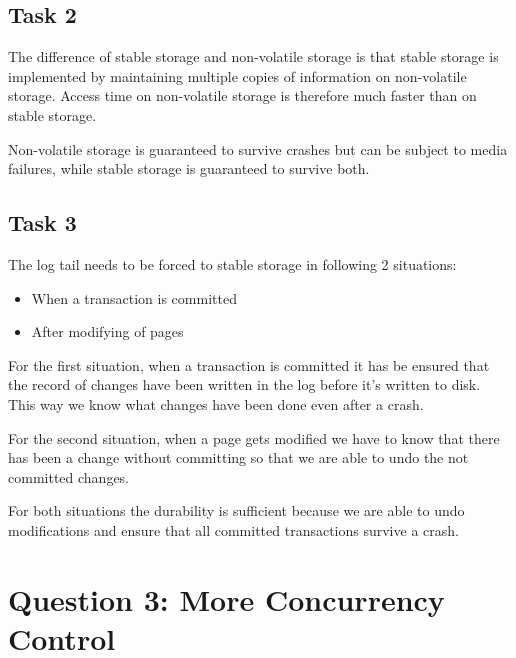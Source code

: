 \documentclass[12pt,a4paper]{article}
\begin{document}
\subsection{Task 2}
The difference of stable storage and non-volatile storage is that stable storage is implemented by maintaining multiple copies of information on non-volatile storage.
Access time on non-volatile storage is therefore much faster than on stable storage.

Non-volatile storage is guaranteed to survive crashes but can be subject to media failures, while stable storage is guaranteed to survive both.


\subsection{Task 3}
The log tail needs to be forced to stable storage in following 2 situations:
\begin{itemize}
	\item When a transaction is committed
	\item After modifying of pages	
\end{itemize}

For the first situation, when a transaction is committed it has be ensured that the record of changes have been written in the log before it's written to disk.
This way we know what changes have been done even after a crash.

For the second situation, when a page gets modified we have to know that there has been a change without committing so that we are able to undo the not committed changes. 

For both situations the durability is sufficient because we are able to undo modifications and ensure that all committed transactions survive a crash.

\section{Question 3: More Concurrency Control}
\end{document}
